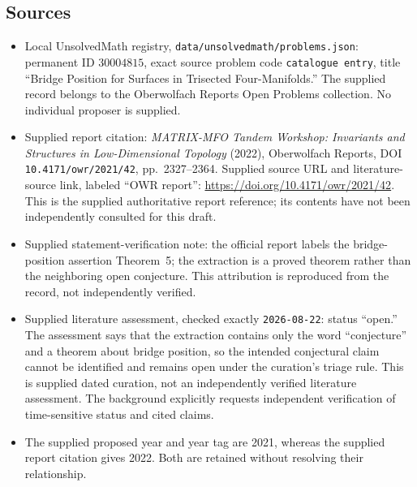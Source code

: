 \documentclass[11pt]{article}
\begin{document}
\subsection{Sources}
\begin{itemize}
\item Local UnsolvedMath registry, \texttt{data/unsolvedmath/problems.json}: permanent ID \(30004815\), exact source problem code \texttt{catalogue entry}, title ``Bridge Position for Surfaces in Trisected Four-Manifolds.'' The supplied record belongs to the Oberwolfach Reports Open Problems collection. No individual proposer is supplied.
\item Supplied report citation: \emph{MATRIX-MFO Tandem Workshop: Invariants and Structures in Low-Dimensional Topology} (2022), Oberwolfach Reports, DOI \texttt{10.4171/owr/2021/42}, pp.~2327--2364. Supplied source URL and literature-source link, labeled ``OWR report'': \url{https://doi.org/10.4171/owr/2021/42}. This is the supplied authoritative report reference; its contents have not been independently consulted for this draft.
\item Supplied statement-verification note: the official report labels the bridge-position assertion Theorem~5; the extraction is a proved theorem rather than the neighboring open conjecture. This attribution is reproduced from the record, not independently verified.
\item Supplied literature assessment, checked exactly \texttt{2026-08-22}: status ``open.'' The assessment says that the extraction contains only the word ``conjecture'' and a theorem about bridge position, so the intended conjectural claim cannot be identified and remains open under the curation's triage rule. This is supplied dated curation, not an independently verified literature assessment. The background explicitly requests independent verification of time-sensitive status and cited claims.
\item The supplied proposed year and year tag are 2021, whereas the supplied report citation gives 2022. Both are retained without resolving their relationship.
\end{itemize}
\end{document}
